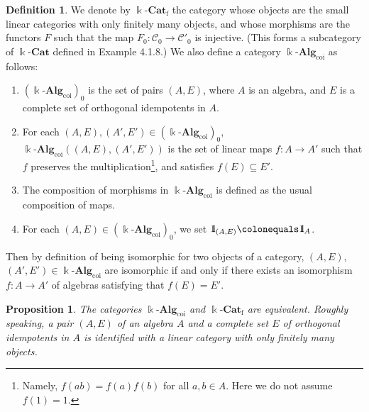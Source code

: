 \documentclass{surv-l}
\makeatletter
\DeclareRobustCommand{\forcelinebreak}{%
    \@ifstar{\unskip\\\ignorespaces}{\unskip\linebreak}%
}
\numberwithin{equation}{chapter}
\numberwithin{figure}{chapter}
\theoremstyle{plain}
\newtheorem{prp}[thm]{Proposition}
\theoremstyle{definition}
\newtheorem{dfn}[thm]{Definition}
\theoremstyle{remark}
\newcommand{\id}{1\kern-.25em{\text{{\rm l}}}}
\newcommand{\kCat}{\Bbbk\text{-}\mathbf{Cat}}
\makeatother
\begin{document}
\begin{dfn}\label{dfn:fin-cats}
We denote by $\kCat_{\mathrm{f}}$ the category whose objects are the
small linear categories with only finitely many objects, \pagebreak 
and
whose morphisms are the functors $F$ such that the map $F_0 \colon {\mathcal{C}}_0 \to {\mathcal{C}}'_0$ is injective.
(This forms a subcategory of $\kCat$ defined in Example 4.1.8.)
We also define a category $\Bbbk\text{-}\mathbf{Alg}_{\mathrm{coi}}$ as follows:
\begin{enumerate}
\item
$(\Bbbk\text{-}\mathbf{Alg}_{\mathrm{coi}})_0$ is the set of pairs $(A, E)$, where $A$ is an algebra,
and $E$ is a complete set of orthogonal idempotents in $A$.
\item
For each $(A, E), (A', E') \in (\Bbbk\text{-}\mathbf{Alg}_{\mathrm{coi}})_0$,
$\Bbbk\text{-}\mathbf{Alg}_{\mathrm{coi}}((A, E), (A', E'))$ is the set of linear maps $f\colon A \to A'$
such that $f$ preserves the multiplication\footnote{
Namely, $f(ab) = f(a)f(b)$ for all $a, b \in A$.
Here we do not assume $f(1) = 1$.},
and satisfies $f(E) \subseteq E'$.
\item
The composition of morphisms in $\Bbbk\text{-}\mathbf{Alg}_{\mathrm{coi}}$ is defined as
the usual composition of maps.
\item
For each $(A, E) \in (\Bbbk\text{-}\mathbf{Alg}_{\mathrm{coi}})_0$, we set $\id_{(A, E)} \colonequals  \id_A$.
\end{enumerate}

Then by definition of being isomorphic for two objects of a category,
$(A, E)$,\forcelinebreak $(A', E') \in \Bbbk\text{-}\mathbf{Alg}_{\mathrm{coi}}$ are isomorphic if and only if
there exists an isomorphism $f \colon A \to A'$ of algebras satisfying
that $f(E) = E'$.
\end{dfn}

\begin{prp}\label{prp:alg-cat}
The categories $\Bbbk\text{-}\mathbf{Alg}_{\mathrm{coi}}$ and $\kCat_{\mathrm{f}}$ are equivalent.\forcelinebreak{}
Roughly speaking, a pair $(A, E)$ of an algebra $A$ and
a complete set $E$ of orthogonal idempotents in $A$ is identified with
a linear category with only finitely many objects.
\end{prp}
\end{document}
